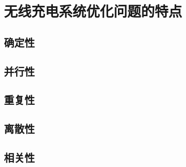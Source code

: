 \documentclass[index]{subfiles}
\begin{document}
\chapter{无线充电系统优化问题的特点}\label{sec:fea}
\section{确定性}
\section{并行性}
\section{重复性}
\section{离散性}\label{sec:fea-discrete}
\section{相关性}
\end{document}
